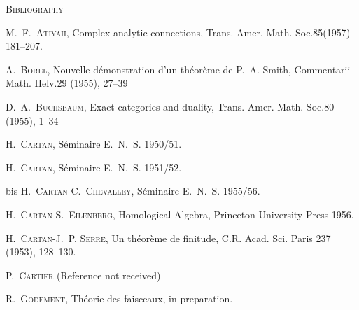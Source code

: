 \clearpage
{}

\begin{center}\normalsize\textsc{Bibliography}\end{center}

\small
\begin{list}{}{%
  \setlength{\leftmargin}{5.3em}%
  \setlength{\itemindent}{-3em}%
  \setlength{\labelwidth}{1.6em}%
  \setlength{\labelsep}{0.7em}%
  \setlength{\itemsep}{0.28em}%
  \setlength{\parsep}{0pt}%
  \setlength{\topsep}{0.3em}%
}
\item[{[1]}] M.\ F.\ \textsc{Atiyah}, Complex analytic connections,
Trans. Amer. Math. Soc.85(1957) 181--207.

\item[{[2]}] A.\ \textsc{Borel}, Nouvelle démonstration d'un théorème de
P.\ A. Smith, Commentarii Math. Helv.29 (1955), 27--39

\item[{[3]}] D.\ A.\ \textsc{Buchsbaum}, Exact categories and duality,
Trans. Amer. Math. Soc.80 (1955), 1--34

\item[{[4]}] H.\ \textsc{Cartan}, Séminaire E.\ N.\ S. 1950/51.

\item[{[5]}] H.\ \textsc{Cartan}, Séminaire E.\ N.\ S. 1951/52.

\item[{[5]}] bis H.\ \textsc{Cartan-C.\ Chevalley}, Séminaire E.\ N.\ S. 1955/56.

\item[{[6]}] H.\ \textsc{Cartan-S.\ Eilenberg}, Homological Algebra,
Princeton University Press 1956.

\item[{[7]}] H.\ \textsc{Cartan-J.\ P. Serre}, Un théorème de finitude,
C.R. Acad. Sci. Paris 237 (1953), 128--130.

\item[{[8]}] P.\ \textsc{Cartier} (Reference not received)

\item[{[9]}] R.\ \textsc{Godement}, Théorie des faisceaux, in preparation.


\end{list}
